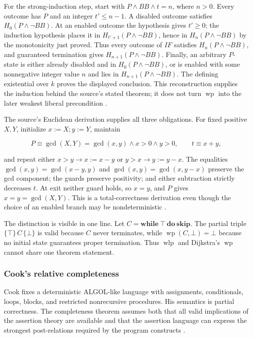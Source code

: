 For the strong-induction step, start with
\(P\land BB\land t=n\), where \(n>0\).  Every outcome has \(P\) and an integer
\(t'\leq n-1\).  A disabled outcome satisfies \(H_0(P\land\neg BB)\).  At an
enabled outcome the hypothesis gives \(t'\geq0\); the induction hypothesis
places it in \(H_{t'+1}(P\land\neg BB)\), hence in
\(H_n(P\land\neg BB)\) by the monotonicity just proved.  Thus every outcome of
\(IF\) satisfies \(H_n(P\land\neg BB)\), and guaranteed termination gives
\(H_{n+1}(P\land\neg BB)\).  Finally, an arbitrary \(P\)-state is either
already disabled and in \(H_0(P\land\neg BB)\), or is enabled with some
nonnegative integer value \(n\) and lies in
\(H_{n+1}(P\land\neg BB)\).  The defining existential over \(k\) proves the
displayed conclusion.  This reconstruction supplies the induction behind the
source's stated theorem; it does not turn \(\operatorname{wp}\) into the later
weakest liberal precondition \cite[\S3.3]{Dijkstra1975}.

The source's Euclidean derivation supplies all three obligations.  For fixed
positive \(X,Y\), initialize \(x:=X;y:=Y\), maintain

\[
 P\equiv \gcd(X,Y)=\gcd(x,y)\land x>0\land y>0,
 \qquad t\equiv x+y,
\]

and repeat either \(x>y\to x:=x-y\) or
\(y>x\to y:=y-x\).  The equalities
\(\gcd(x,y)=\gcd(x-y,y)\) and
\(\gcd(x,y)=\gcd(x,y-x)\) preserve the gcd component; the guards preserve
positivity; and either subtraction strictly decreases \(t\).  At exit neither
guard holds, so \(x=y\), and \(P\) gives
\(x=y=\gcd(X,Y)\).  This is a total-correctness derivation even though the
choice of an enabled branch may be nondeterministic \cite[\S4]{Dijkstra1975}.

The distinction is visible in one line.  Let
\(C=\mathbf{while}\ \top\ \mathbf{do}\ \mathbf{skip}\).  The partial triple
\(\{\top\}\,C\,\{\bot\}\) is valid because \(C\) never terminates, while
\(\operatorname{wp}(C,\bot)=\bot\) because no initial state guarantees proper
termination.  Thus \(\operatorname{wlp}\) and Dijkstra's \(\operatorname{wp}\)
cannot share one theorem statement.

\subsubsection{Cook's relative completeness}

Cook fixes a deterministic ALGOL-like language with assignments,
conditionals, loops, blocks, and restricted nonrecursive procedures.  His
semantics is partial correctness.  The completeness theorem assumes both that
all valid implications of the assertion theory are available and that the
assertion language can express the strongest post-relations required by the
program constructs \cite[\S\S2--6]{Cook1978}.

